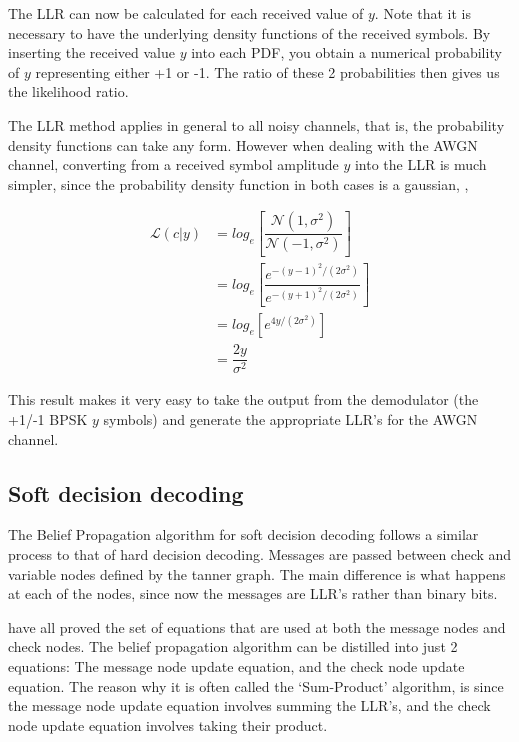 \documentclass[11pt]{article}
\numberwithin{equation}{subsection}
\begin{document}
\noindent The LLR can now be calculated for each received value of $y$. Note that it is necessary to have the underlying density functions of the received symbols. By inserting the received value $y$ into each PDF, you obtain a numerical probability of $y$ representing either +1 or -1. The ratio of these 2 probabilities then gives us the likelihood ratio.

The LLR method applies in general to all noisy channels, that is, the probability density functions can take any form. However when dealing with the AWGN channel, converting from a received symbol amplitude $y$ into the LLR is much simpler, since the probability density function in both cases is a gaussian, \cite{cho2012analysis},

\begin{equation} \label{eq:LLR_awgn}
\begin{aligned}
\mathcal{L}(c|y) &= log_e \left[ \dfrac{\mathcal{N}(1,\sigma^2)} {\mathcal{N}(-1,\sigma^2)} \right] 
\\
&= log_e \left[ \dfrac{e^{-(y-1)^2/(2\sigma^2)}}{e^{-(y+1)^2/(2\sigma^2)}} \right]
\\
&= log_e \left[ e^{4y/(2\sigma^2)} \right]
\\
&= \dfrac{2y}{\sigma^2}
\end{aligned}
\end{equation}

\noindent This result makes it very easy to take the output from the demodulator (the +1/-1 BPSK $y$ symbols) and generate the appropriate LLR's for the AWGN channel.

\subsection{Soft decision decoding}
The Belief Propagation algorithm for soft decision decoding follows a similar process to that of hard decision decoding. Messages are passed between check and variable nodes defined by the tanner graph. The main difference is what happens at each of the nodes, since now the messages are LLR's rather than binary bits. 

\cite{ldpc-tutorial1,mncisit,gallager1962low} have all proved the set of equations that are used at both the message nodes and check nodes. The belief propagation algorithm can be distilled into just 2 equations: The message node update equation, and the check node update equation. The reason why it is often called the `Sum-Product' algorithm, is since the message node update equation involves summing the LLR's, and the check node update equation involves taking their product.
\end{document}
